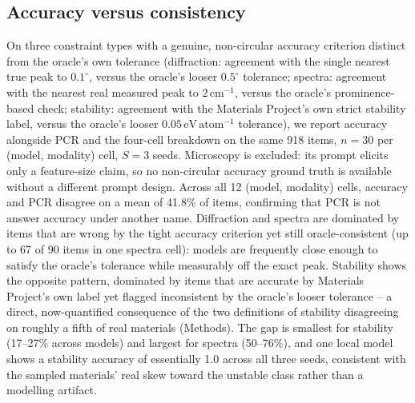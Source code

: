 \documentclass[pdflatex,sn-nature]{sn-jnl}
\begin{document}
\subsection*{Accuracy versus consistency}
On three constraint types with a genuine, non-circular accuracy criterion distinct
from the oracle's own tolerance (diffraction: agreement with the single nearest true
peak to $0.1^{\circ}$, versus the oracle's looser $0.5^{\circ}$ tolerance; spectra:
agreement with the nearest real measured peak to $2\,\mathrm{cm}^{-1}$, versus the
oracle's prominence-based check; stability: agreement with the Materials Project's own
strict stability label, versus the oracle's looser $0.05\,\mathrm{eV\,atom^{-1}}$
tolerance), we report accuracy alongside PCR and the four-cell breakdown on the same
918 items, $n=30$ per (model, modality) cell, $S=3$ seeds. Microscopy is excluded: its
prompt elicits only a feature-size claim, so no non-circular accuracy ground truth is
available without a different prompt design. Across all 12 (model, modality) cells,
accuracy and PCR disagree on a mean of 41.8\% of items, confirming that PCR is not
answer accuracy under another name. Diffraction and spectra are dominated by items
that are wrong by the tight accuracy criterion yet still oracle-consistent (up to 67
of 90 items in one spectra cell): models are frequently close enough to satisfy the
oracle's tolerance while measurably off the exact peak. Stability shows the opposite
pattern, dominated by items that are accurate by Materials Project's own label yet
flagged inconsistent by the oracle's looser tolerance -- a direct, now-quantified
consequence of the two definitions of stability disagreeing on roughly a fifth of
real materials (Methods). The gap is smallest for stability (17--27\% across models)
and largest for spectra (50--76\%), and one local model shows a stability accuracy of
essentially 1.0 across all three seeds, consistent with the sampled materials' real
skew toward the unstable class rather than a modelling artifact.
\end{document}
